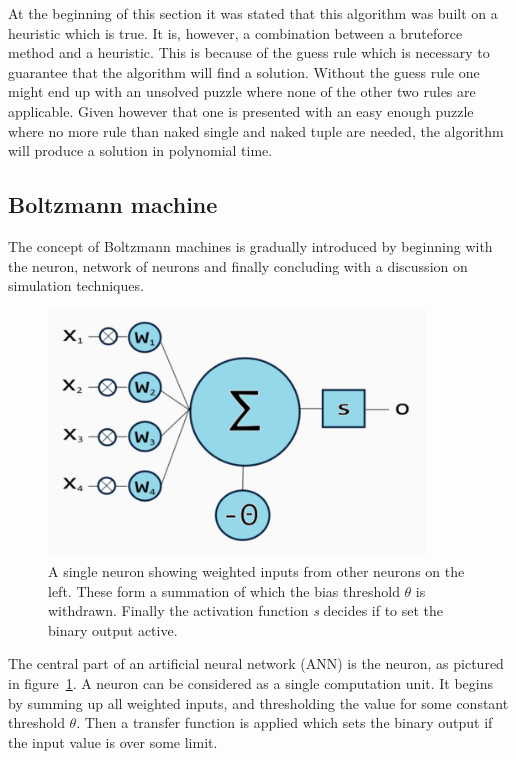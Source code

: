 \documentclass[a4paper,11pt]{kth-mag}
\begin{document}
At the beginning of this section it was stated that this algorithm was built on a heuristic which is true.
It is, however, a combination between a bruteforce method and a heuristic.
This is because of the guess rule which is necessary to guarantee that the algorithm will find a solution.
Without the guess rule one might end up with an unsolved puzzle where none of the other two rules are applicable.
Given however that one is presented with an easy enough puzzle where no more rule than naked single and naked tuple are needed, the algorithm will produce a solution in polynomial time.

\FloatBarrier
\subsection{Boltzmann machine}
\label{sec:boltzmannBackground}
The concept of Boltzmann machines is gradually introduced by beginning with the neuron, 
network of neurons and finally concluding with a discussion on simulation techniques.\\

\begin{figure}[here] 
\centering
\includegraphics[width=10cm]{images/neuron.png}
\caption{A single neuron showing weighted inputs from other neurons on the left. These form a summation of which the bias threshold $\theta$ is withdrawn. Finally the activation function \emph{s} decides if to set the binary output active.}
\label{fig:neural-Neuron}
\end{figure}
The central part of an artificial neural network (ANN) is the neuron, as pictured in figure~\ref{fig:neural-Neuron}.
A neuron can be considered as a single computation unit.
It begins by summing up all weighted inputs, and thresholding the value for some constant threshold $\theta$.
Then a transfer function is applied which sets the binary output if the input value is over some limit.
\end{document}
